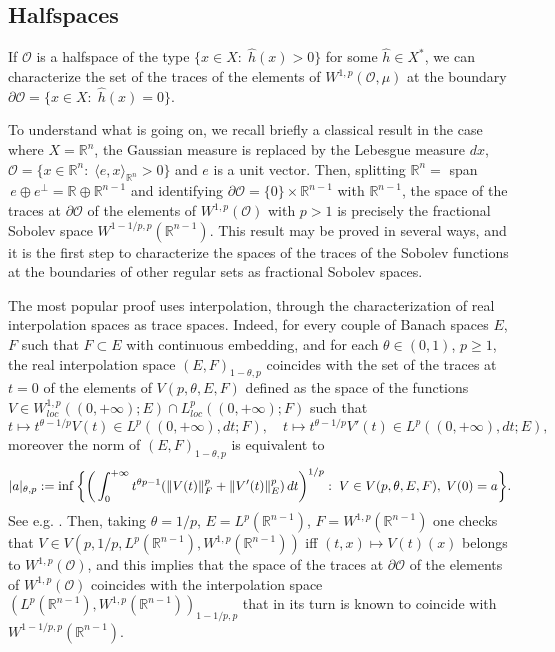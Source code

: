 \documentclass[reqno,twoside,12pt]{amsart}
\begin{document}
\subsection{Halfspaces}
\label{half}

If ${\mathcal O}$ is a halfspace of the type $\{x\in X: \; \hat{h}(x) > 0\}$  for some $\hat{h}\in X^*$, we can characterize the set of the traces of the elements of  $W^{1,p}({\mathcal O}, \mu)$ at the boundary $\partial {\mathcal O}= \{x\in X: \; \hat{h}(x) =0\}$. 

To understand what is going on, we recall briefly a classical result in the case where $X={\mathbb R}^n$, the Gaussian measure is replaced by the Lebesgue measure $dx$, ${\mathcal O} = \{x\in {\mathbb R}^n:\; \langle e, x\rangle_{{\mathbb R}^n}>0\}$ and $e$ is a unit vector. 
Then, splitting ${\mathbb R}^n =$  span$\,e \oplus e^{\perp} = {\mathbb R} \oplus {\mathbb R}^{n-1}$ and identifying 
$\partial {\mathcal O} = \{0\} \times {\mathbb R}^{n-1}$ with $ {\mathbb R}^{n-1}$,  the space of the traces at $\partial {\mathcal O} $ of the elements of $W^{1,p}({\mathcal O})$ with $p>1$ is precisely the fractional Sobolev space $W^{1-1/p,p}({\mathbb R}^{n-1})$. This result may be proved in several ways, and it is the first step to characterize the spaces of the traces of the Sobolev functions at the boundaries of other regular sets as fractional Sobolev spaces. 

The most popular proof uses interpolation, through the characterization of real interpolation spaces as trace spaces. Indeed,  for every couple of Banach spaces $E$, $F$ such that  $F\subset E$ with continuous embedding, and for each  $\theta \in (0, 1)$, $p\geq 1$, the real  interpolation space 
$(E, F)_{1-\theta, p}$ coincides with the set of the traces at  $t=0$ of the elements of $V(p, \theta, E,F)$ defined as the space of the functions 
$V\in W^{1,p}_{loc}((0, +\infty);E) \cap L^{p}_{loc}((0, +\infty);F)$ such that 
$$t\mapsto t^{\theta -1/p} V(t) \in L^{p} ((0, +\infty),  dt;F), \quad t\mapsto t^{\theta -1/p} V'(t) \in L^{p} ((0, +\infty), dt;E), $$
moreover the norm of $(E, F)_{1-\theta, p}$ is equivalent to 
$$ |a|_{\theta, p}  := \inf\bigg\{   \bigg({\displaystyle} \int_{0}^{+\infty} t ^{\theta p-1 } (\| V(t) \|_{F}^p +  \| V'(t) \|_{E}^p) \,dt\bigg)^{1/p} :\; V\in V(p, \theta,  E,F), \;V(0)=a\bigg\} .
$$
See e.g. \cite[\S 1.8.2]{Tr}. Then, taking $\theta= 1/p$, $E=L^p({\mathbb R}^{n-1})$, $F= W^{1,p}({\mathbb R}^{n-1})$  one checks that $V\in  V(p, 1/p, L^p({\mathbb R}^{n-1}),W^{1,p}({\mathbb R}^{n-1}))$  iff $(t,x)\mapsto V(t)(x)$ belongs to 
$W^{1,p}({\mathcal O})$, and this implies that the space of the traces at $\partial {\mathcal O}$ of the elements of $W^{1,p}({\mathcal O})$ coincides with the interpolation space $(L^p({\mathbb R}^{n-1}), W^{1,p}({\mathbb R}^{n-1}))_{1-1/p, p}$ that in its turn is known to coincide with $W^{1-1/p,p}({\mathbb R}^{n-1})$. 
\end{document}
